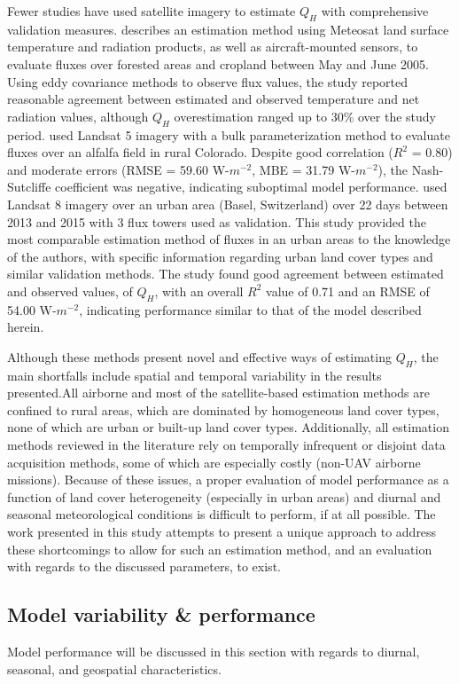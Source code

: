 Fewer studies have used satellite imagery to estimate $Q_H$ with comprehensive validation measures. \citet{Miglietta_2009} describes an estimation method using Meteosat land surface temperature and radiation products, as well as aircraft-mounted sensors, to evaluate fluxes over forested areas and cropland between May and June 2005. Using eddy covariance methods to observe flux values,  the study reported reasonable agreement between estimated and observed temperature and net radiation values, although $Q_H$ overestimation ranged up to 30\% over the study period.  \citet{Mkhwanazi_2012} used Landsat 5 imagery with a bulk parameterization method to evaluate fluxes over an alfalfa field in rural Colorado.  Despite good correlation ($R^2$ = 0.80) and moderate errors (RMSE = 59.60 W-$m^{-2}$, MBE = 31.79 W-$m^{-2}$), the Nash-Sutcliffe coefficient was negative, indicating suboptimal model performance. \citet{Feigenwinter_2018} used Landsat 8 imagery over an urban area (Basel, Switzerland) over 22 days between 2013 and 2015 with 3 flux towers used as validation. This study provided the most comparable estimation method of fluxes in an urban areas to the knowledge of the authors, with specific information regarding urban land cover types and similar validation methods. The study found good agreement between estimated and observed values, of $Q_H$, with an overall $R^2$ value of 0.71 and an RMSE of 54.00 W-$m^{-2}$, indicating performance similar to that of the model described herein.

Although these methods present novel and effective ways of estimating $Q_H$, the main shortfalls include spatial and temporal variability in the results presented.All airborne and most of the satellite-based estimation methods are confined to rural areas, which are dominated by homogeneous land cover types,  none of which are urban or built-up land cover types. Additionally, all estimation methods reviewed in the literature rely on temporally infrequent or disjoint data acquisition methods, some of which are especially costly (non-UAV airborne missions). Because of these issues, a proper evaluation of model performance as a function of land cover heterogeneity (especially in urban areas) and diurnal and seasonal meteorological conditions is difficult to perform, if at all possible. The work presented in this study attempts to present a unique approach to address these shortcomings to allow for such an estimation method, and an evaluation with regards to the discussed parameters, to exist.

\subsection{Model variability \& performance} \label{section:discussion-model-variability}
Model performance will be discussed in this section with regards to diurnal, seasonal, and geospatial characteristics. 

